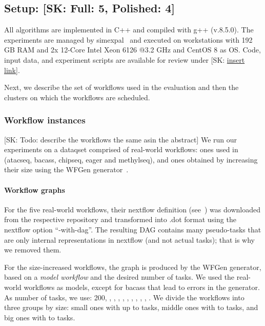 \documentclass[conference]{IEEEtran}
\newcommand{\skug}[1]{{\color{blue}[SK: #1]}}
\begin{document}
    \subsection{Setup: \skug{Full: 5, Polished: 4}}
    \label{sec:setup}

    All algorithms are implemented in C++ and compiled with g++ (v.8.5.0).
    The experiments are managed by simexpal~\cite{DBLP:journals/algorithms/AngrimanGLMNPT19} and executed on workstations with 192 GB RAM and 2x 12-Core Intel Xeon 6126 @3.2 GHz
    and CentOS 8 as OS.
    Code, input data, and experiment scripts are available for review under \skug{\url{insert link}}.

    Next, we describe the set of workflows used in the evaluation and then the clusters on which the
    workflows are scheduled.

    \subsubsection{Workflow instances}
    \skug{Todo: describe the workflows the same asin the abstract}
    We run our experiments on a dataqset comprised of real-world workflows: ones used in~\cite{lotaru} (atacseq, bacass, chipseq,
    eager and methylseq), and ones obtained by increasing their size using the WFGen generator~\cite{COLEMAN202216}.


    \paragraph{Workflow graphs}
    For the five real-world workflows, their nextflow definition (see~\cite{ewels2020nf}) was downloaded from the
    respective repository and transformed into .dot format using the nextflow option ``-with-dag''.
    The resulting DAG contains many pseudo-tasks that are only internal representations in nextflow
    (and not actual tasks); that is why we removed them.

    For the size-increased workflows, the graph is produced by the WFGen generator, based on a {\em model workflow} and
    the desired number of tasks.
    We used the real-world workflows as models, except for bacass that lead to errors in the generator.
%
    As number of tasks, we use: 200, , , , , ,
    , , , , .
    We divide the workflows into three groups by size: small ones with up to  tasks, middle
    ones with  to  tasks, and big ones with  to  tasks.
\end{document}
